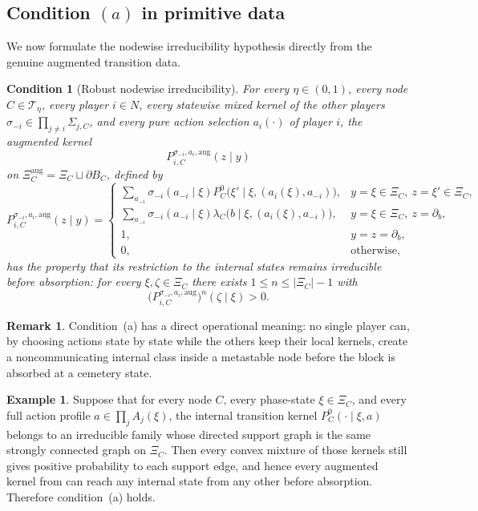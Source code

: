 \documentclass[12pt]{article}
\newtheorem{condition}[theorem]{Condition}
\theoremstyle{definition}
\newtheorem{remark}[theorem]{Remark}
\newtheorem{example}[theorem]{Example}
\newcommand{\1}{\mathbf{1}}
\newcommand{\cT}{\mathcal{T}}
\begin{document}
\subsection{Condition \texorpdfstring{$(a)$}{(a)} in primitive data}

We now formulate the nodewise irreducibility hypothesis directly from the genuine
augmented transition data.

\begin{condition}[Robust nodewise irreducibility]
\label{cond:a}
For every $\eta\in(0,1)$, every node $C\in\cT_\eta$, every player $i\in N$, every
statewise mixed kernel of the other players
$\sigma_{-i}\in\prod_{j\ne i}\Sigma_{j,C}$, and every pure action selection
$a_i(\cdot)$ of player $i$, the augmented kernel
\[
P_{i,C}^{\sigma_{-i},a_i,\mathrm{aug}}(z\mid y)
\]
on $\Xi_C^{\mathrm{aug}}=\Xi_C\sqcup\partial B_C$, defined by
\[
P_{i,C}^{\sigma_{-i},a_i,\mathrm{aug}}(z\mid y)
=
\begin{cases}
\displaystyle
\sum_{a_{-i}}\sigma_{-i}(a_{-i}\mid\xi)
P_C^0\bigl(\xi'\mid\xi,(a_i(\xi),a_{-i})\bigr),
& y=\xi\in\Xi_C,\ z=\xi'\in\Xi_C,\\[0.7em]
\displaystyle
\sum_{a_{-i}}\sigma_{-i}(a_{-i}\mid\xi)
\lambda_C\bigl(b\mid\xi,(a_i(\xi),a_{-i})\bigr),
& y=\xi\in\Xi_C,\ z=\partial_b,\\[0.7em]
1, & y=z=\partial_b,\\
0, & \text{otherwise,}
\end{cases}
\]
has the property that its restriction to the internal states remains irreducible
before absorption: for every $\xi,\zeta\in\Xi_C$ there exists
$1\le n\le |\Xi_C|-1$ with
\[
\bigl(P_{i,C}^{\sigma_{-i},a_i,\mathrm{aug}}\bigr)^n(\zeta\mid\xi)>0.
\]
\end{condition}

\begin{remark}
Condition~\textnormal{(a)} has a direct operational meaning: no single player can,
by choosing actions state by state while the others keep their local kernels,
create a noncommunicating internal class inside a metastable node before the block
is absorbed at a cemetery state.
\end{remark}

\begin{example}
\label{ex:cond-a-trivial}
Suppose that for every node $C$, every phase-state $\xi\in\Xi_C$, and every full
action profile $a\in\prod_j A_j(\xi)$, the internal transition kernel
$P_C^0(\cdot\mid\xi,a)$ belongs to an irreducible family whose directed support
graph is the same strongly connected graph on $\Xi_C$. Then every convex mixture
of those kernels still gives positive probability to each support edge, and hence
every augmented kernel from  can reach any internal state from any
other before absorption. Therefore condition~\textnormal{(a)} holds.
\end{example}
\end{document}
